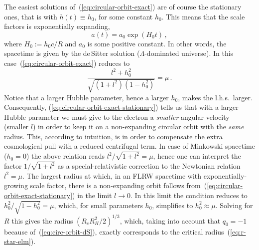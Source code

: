 \documentclass
[rmp,aps,twocolumn,showpacs,preprintnumbers,amsmath,amssymb]{revtex4}
\theoremstyle{plain}
\theoremstyle{definition}
\theoremstyle{remark}
\begin{document}
The easiest solutions of~(\ref{eq:circular-orbit-exact}) are of course the
stationary ones, that is with $h(t)\equiv h_0$, for some constant 
$h_0$. This means that the scale factors is exponentially expanding, 
%
\begin{equation}\label{eq:circ-orbit-dS}
  a(t)=a_0\exp(H_0 t) \,,
\end{equation}
%
where $H_0:=h_0 c/R$ and $a_0$ is some positive constant. In other 
words, the spacetime is given by the de\,Sitter solution 
($\Lambda$-dominated universe). In this 
case~(\ref{eq:circular-orbit-exact}) reduces to 
%
\begin{equation}\label{eq:circular-orbit-exact-stationary}
  \frac{l^2+h_0^2}{\sqrt{(1+l^2)(1-h_0^2)}} = \mu \,.
\end{equation}
%
Notice that a larger Hubble parameter, hence a larger $h_0$, makes the 
l.h.s.~larger. Consequently, (\ref{eq:circular-orbit-exact-stationary}) 
tells us that with a larger Hubble parameter we must give to the electron 
a \emph{smaller} angular velocity (smaller $l$) in order to keep it on a 
non-expanding circular orbit with the \emph{same} radius. This, according 
to intuition, is in order to compensate the extra cosmological pull 
with a reduced centrifugal term. In case of Minkowski spacetime ($h_0=0$) 
the above relation reads $l^2/\sqrt{1+l^2}=\mu$, hence one can interpret 
the factor $1/\sqrt{1+l^2}$ as a special-relativistic correction to the 
Newtonian relation $l^2=\mu$. 
The largest radius at which, in an FLRW spacetime with exponentially-growing 
scale factor, there is a non-expanding orbit follows 
from~(\ref{eq:circular-orbit-exact-stationary}) in the limit $l\to 0$. 
In this limit the condition reduces to $h_0^2/\sqrt{1-h_0^2}=\mu$, which, 
for small parameters $h_0$, simplifies to $h_0^2 \approx \mu$. Solving for 
$R$ this gives the radius $(R_e R_H^2/2)^{1/3}$, which, taking into account 
that $q_0=-1$ because of~(\ref{eq:circ-orbit-dS}), exactly corresponds to the 
critical radius~(\ref{eq:r-star-elm}). 
\end{document}
